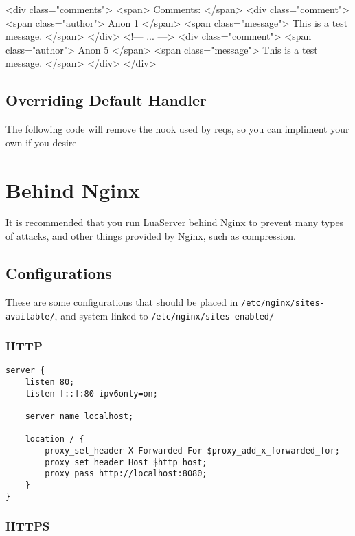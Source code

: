 \documentclass[a4paper,11pt]{report}
\newcommand{\setlua}{\lstset{language=Lua}}
\newcommand{\inlinecode}{\texttt}
\begin{document}
\begin{html}
<div class="comments">
	<span>
		Comments:
	</span>
	<div class="comment">
		<span class="author">
			Anon 1
		</span>
		<span class="message">
			This is a test message.
		</span>
	</div>
	<!--- ... --->
	<div class="comment">
		<span class="author">
			Anon 5
		</span>
		<span class="message">
			This is a test message.
		</span>
	</div>
</div>
\end{html}

\setlua
\section{Overriding Default Handler}

The following code will remove the hook used by reqs, so you can impliment your own if you desire

\chapter{Behind Nginx}

It is recommended that you run LuaServer behind Nginx to prevent many types of attacks, and other things provided by Nginx, such as compression.

\section{Configurations}
These are some configurations that should be placed in \inlinecode{/etc/nginx/sites-available/}, and system linked to \inlinecode{/etc/nginx/sites-enabled/}

\subsection{HTTP}

\begin{lstlisting}
server {
	listen 80;
	listen [::]:80 ipv6only=on;

	server_name localhost;

	location / {
		proxy_set_header X-Forwarded-For $proxy_add_x_forwarded_for;
		proxy_set_header Host $http_host;
		proxy_pass http://localhost:8080;
	}
}
\end{lstlisting}

\subsection{HTTPS}
\end{document}
